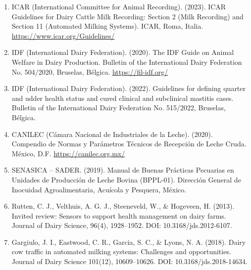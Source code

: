 \begin{enumerate}
  \item ICAR (International Committee for Animal Recording). (2023). ICAR Guidelines for Dairy Cattle Milk Recording: Section 2 (Milk Recording) and Section 11 (Automated Milking Systems). ICAR, Roma, Italia. \url{https://www.icar.org/Guidelines/}
  \item IDF (International Dairy Federation). (2020). The IDF Guide on Animal Welfare in Dairy Production. Bulletin of the International Dairy Federation No. 504/2020, Bruselas, Bélgica. \url{https://fil-idf.org/}
  \item IDF (International Dairy Federation). (2022). Guidelines for defining quarter and udder health status and cured clinical and subclinical mastitis cases. Bulletin of the International Dairy Federation No. 515/2022, Bruselas, Bélgica.
  \item CANILEC (Cámara Nacional de Industriales de la Leche). (2020). Compendio de Normas y Parámetros Técnicos de Recepción de Leche Cruda. México, D.F. \url{https://canilec.org.mx/}
  \item SENASICA – SADER. (2019). Manual de Buenas Prácticas Pecuarias en Unidades de Producción de Leche Bovina (BPPL-01). Dirección General de Inocuidad Agroalimentaria, Acuícola y Pesquera, México.
  \item Rutten, C. J., Velthuis, A. G. J., Steeneveld, W., \& Hogeveen, H. (2013). Invited review: Sensors to support health management on dairy farms. Journal of Dairy Science, 96(4), 1928–1952. DOI: 10.3168/jds.2012-6107.
  \item Gargiulo, J. I., Eastwood, C. R., Garcia, S. C., \& Lyons, N. A. (2018). Dairy cow traffic in automated milking systems: Challenges and opportunities. Journal of Dairy Science 101(12), 10609–10626. DOI: 10.3168/jds.2018-14634.
\end{enumerate}
